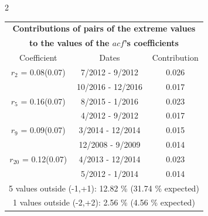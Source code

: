 
\thispagestyle{empty}
\begin{multicols}{2}{ 
\begin{tabular}{ccc}
\multicolumn{3}{c}{\textbf{Contributions of pairs of the extreme values} }  \vspace{-.10in}  \\ 
\multicolumn{3}{c}{ \textbf{to the values of the $acf$'s coefficients}} \\ 
\hline 
\hline                  Coefficient  &  Dates &  Contribution \\ 
\hline 
  $r_{ 2}$ = 0.08(0.07) &       7/2012 -  9/2012 &        0.026   \vspace{-.10in} \\  
&       10/2016 - 12/2016 &        0.017  \vspace{-.02in} \\ \hline 
  $r_{ 5}$ = 0.16(0.07) &       8/2015 -  1/2016 &        0.023   \vspace{-.10in} \\  
&        4/2012 -  9/2012 &        0.017  \vspace{-.02in} \\ \hline 
  $r_{ 9}$ = 0.09(0.07) &       3/2014 - 12/2014 &        0.015   \vspace{-.10in} \\  
&       12/2008 -  9/2009 &        0.014  \vspace{-.02in} \\ \hline 
  $r_{20}$ = 0.12(0.07) &       4/2013 - 12/2014 &        0.023   \vspace{-.10in} \\  
&        5/2012 -  1/2014 &        0.014  \vspace{-.02in} \\ \hline 
\multicolumn{3}{c}{               5 values outside (-1,+1): 12.82  \% (31.74  \% expected)}\vspace{-.10in} \\ 
\multicolumn{3}{c}{               1 values outside (-2,+2):  2.56 \%  (4.56 \% expected) } \\
 \end{tabular} \\ 
 } 
\end{multicols} 
